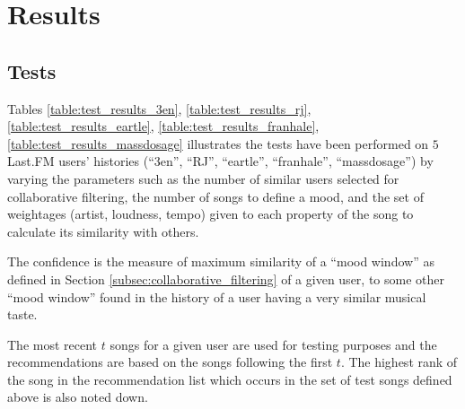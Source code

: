 \chapter{Results}
	\section{Tests}
		Tables \ref{table:test_results_3en}, \ref{table:test_results_rj}, \ref{table:test_results_eartle}, \ref{table:test_results_franhale}, \ref{table:test_results_massdosage} illustrates the tests have been performed on \(5\) Last.FM users' histories (``3en'', ``RJ'', ``eartle'', ``franhale'', ``massdosage'') by varying the parameters such as the number of similar users selected for collaborative filtering, the number of songs to define a mood, and the set of weightages (artist, loudness, tempo) given to each property of the song to calculate its similarity with others.

		The confidence is the measure of maximum similarity of a ``mood window'' as defined in Section \ref{subsec:collaborative_filtering} of a given user, to some other ``mood window'' found in the history of a user having a very similar musical taste.
		
		The most recent \(t\) songs for a given user are used for testing purposes and the recommendations are based on the songs following the first \(t\). The highest rank of the song in the recommendation list which occurs in the set of test songs defined above is also noted down.
		
